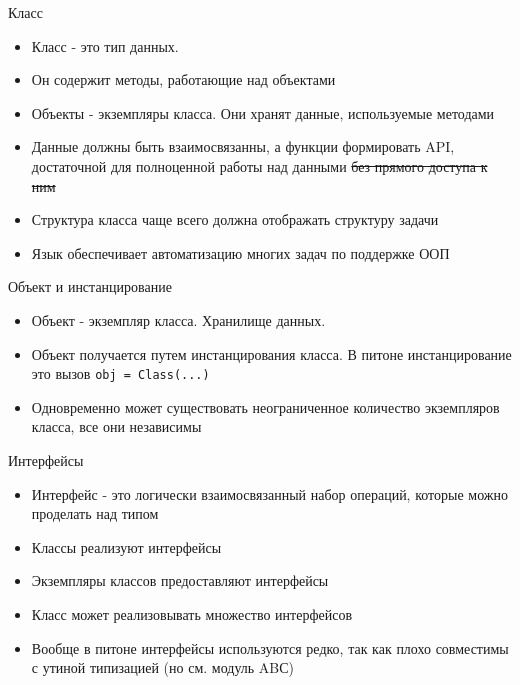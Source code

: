 \documentclass{article}
\begin{document}
\LARGE

\begin{center} Класс \end{center}
\begin{itemize}
    \item Класс - это тип данных.
    \item Он содержит методы, работающие над объектами
    \item Объекты - экземпляры класса. Они хранят данные, используемые методами
    \item Данные должны быть взаимосвязанны, а функции формировать API, 
            достаточной для полноценной работы над данными   \sout{без прямого 
            доступа к ним}
    \item Структура класса чаще всего должна отображать структуру задачи
    \item Язык обеспечивает автоматизацию многих задач по поддержке ООП
\end{itemize}
\newpage

\begin{center} Объект и инстанцирование \end{center}
\begin{itemize}
    \item Объект - экземпляр класса. Хранилище данных.
    \item Объект получается путем инстанцирования класса. 
          В питоне инстанцирование это вызов
               \lstinline!obj = Class(...)!
    \item Одновременно может существовать неограниченное количество 
          экземпляров класса, все они независимы
\end{itemize}
\newpage

\begin{center} Интерфейсы \end{center}
\begin{itemize}
    \item Интерфейс - это логически взаимосвязанный набор операций, 
          которые можно проделать над типом
    \item Классы реализуют интерфейсы
    \item Экземпляры классов предоставляют интерфейсы
    \item Класс может реализовывать множество интерфейсов
    \item Вообще в питоне интерфейсы используются редко, 
          так как плохо совместимы с утиной типизацией (но см. модуль ABС)
\end{itemize}
\newpage
\end{document}
